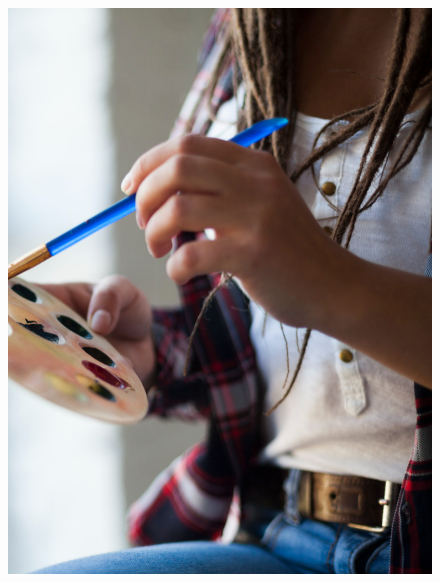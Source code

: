 \begin{figure}[htpb]
\vspace*{-2.5cm}
\hspace{-3cm}\includegraphics[height=\paperheight]{../separadores/separadorART9B.png}
\end{figure}
\setcounter{chapter}{0}




